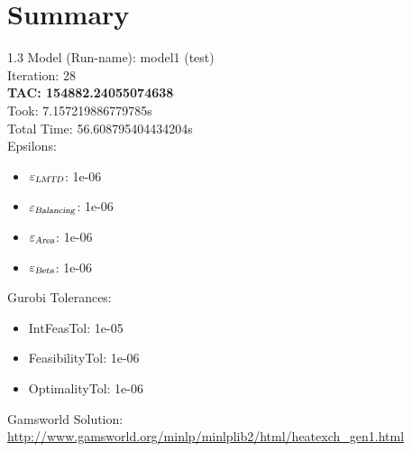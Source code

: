 \documentclass{article}%
\begin{document}
%
\normalsize%
\section{Summary}%
\thispagestyle{plain}%
\begin{spacing}{1.3}%
\Large%
Model (Run-name): model1 (test)\\%
Iteration: 28\\%
\textbf{TAC: 154882.24055074638}\\%
Took: 7.157219886779785s\\%
Total Time: 56.608795404434204s\\%
Epsilons:%
\begin{itemize}%
	\item $\varepsilon_{\textsl{LMTD}}$: 1e-06%
	\item $\varepsilon_{\textsl{Balancing}}$: 1e-06%
	\item $\varepsilon_{\textsl{Area}}$: 1e-06%
	\item $\varepsilon_{\textsl{Beta}}$: 1e-06%
\end{itemize}%
Gurobi Tolerances:%
\begin{itemize}%
	\item IntFeasTol: 1e-05%
	\item FeasibilityTol: 1e-06%
	\item OptimalityTol: 1e-06%
\end{itemize}%
\end{spacing}%
\normalsize%
Gamsworld Solution: \url{http://www.gamsworld.org/minlp/minlplib2/html/heatexch_gen1.html}%
%
\clearpage%
\end{document}

